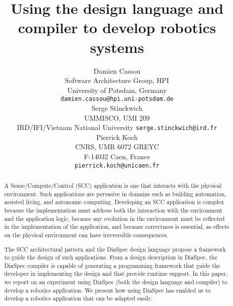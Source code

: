 \documentclass[letterpaper, 10 pt, conference]{ieeeconf}  %
\title{Using the \diaspec{} design language and compiler to develop
  robotics systems}
\author{%
  \parbox{2.5 in}{\centering Damien Cassou\\
    Software Architecture Group, HPI\\
    University of Potsdam, Germany\\%
    {\tt\small damien.cassou@hpi.uni-potsdam.de}}
  \parbox{2.5 in}{ \centering Serge Stinckwich\\
UMMISCO, UMI 209\\IRD/IFI/Vietnam National University
    {\tt\small serge.stinckwich@ird.fr}}
  \parbox{2.5 in}{ \centering Pierrick Koch\\
CNRS, UMR 6072 GREYC\\ F-14032 Caen, France\\
    {\tt\small pierrick.koch@unicaen.fr}}
}
\newcommand{\diaspec}{Dia\-Spec\xspace}
\begin{document}
\maketitle
\thispagestyle{empty}
\pagestyle{empty}


\begin{abstract}

  A Sense/Compute/Control (SCC) application is one that interacts with
  the physical environment. Such applications are pervasive in domains
  such as building automation, assisted living, and autonomic
  computing. Developing an SCC application is complex because the
  implementation must address both the interaction with the
  environment and the application logic, because any evolution in the
  environment must be reflected in the implementation of the
  application, and because correctness is essential, as effects on the
  physical environment can have irreversible consequences.

  The SCC architectural pattern and the \diaspec{} design language
  propose a framework to guide the design of such applications. From a
  design description in \diaspec{}, the \diaspec{} compiler is capable
  of generating a programming framework that guide the developer in
  implementing the design and that provide runtime support. In this
  paper, we report on an experiment using \diaspec{} (both the design
  language and compiler) to develop a robotics application. We present
  how using \diaspec{} has enabled us to develop a robotics
  application that can be adapted easily.

\end{abstract}





\end{document}
